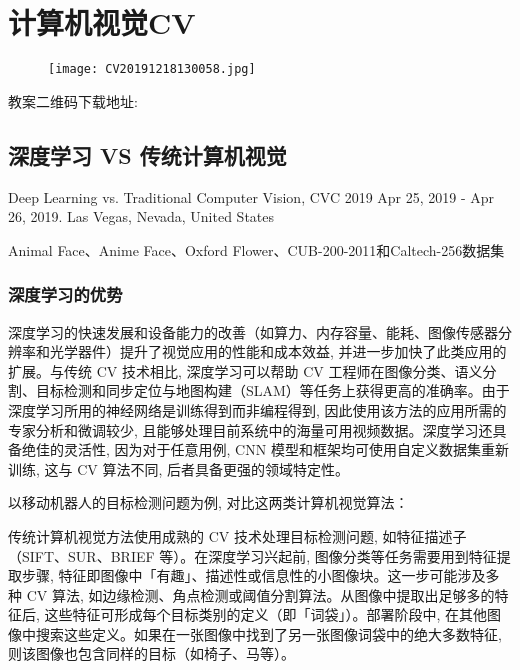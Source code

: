 \chapter{计算机视觉CV}\label{AIChapter11}
\begin{figure}[H]
\centering
\texttt{[image: CV20191218130058.jpg]}
\label{CV20191218130058}
\end{figure}
教案二维码下载地址: 
\newpage
\section{深度学习 VS 传统计算机视觉}
Deep Learning vs. Traditional Computer Vision, CVC 2019  Apr 25, 2019 - Apr 26, 2019. Las Vegas, Nevada, United States \cite{MahonyCVC2019}

Animal Face、Anime Face、Oxford Flower、CUB-200-2011和Caltech-256数据集


\subsection{深度学习的优势}

深度学习的快速发展和设备能力的改善（如算力、内存容量、能耗、图像传感器分辨率和光学器件）提升了视觉应用的性能和成本效益, 并进一步加快了此类应用的扩展。与传统 CV 技术相比, 深度学习可以帮助 CV 工程师在图像分类、语义分割、目标检测和同步定位与地图构建（SLAM）等任务上获得更高的准确率。由于深度学习所用的神经网络是训练得到而非编程得到, 因此使用该方法的应用所需的专家分析和微调较少, 且能够处理目前系统中的海量可用视频数据。深度学习还具备绝佳的灵活性, 因为对于任意用例, CNN 模型和框架均可使用自定义数据集重新训练, 这与 CV 算法不同, 后者具备更强的领域特定性。

以移动机器人的目标检测问题为例, 对比这两类计算机视觉算法：

传统计算机视觉方法使用成熟的 CV 技术处理目标检测问题, 如特征描述子（SIFT、SUR、BRIEF 等）。在深度学习兴起前, 图像分类等任务需要用到特征提取步骤, 特征即图像中「有趣」、描述性或信息性的小图像块。这一步可能涉及多种 CV 算法, 如边缘检测、角点检测或阈值分割算法。从图像中提取出足够多的特征后, 这些特征可形成每个目标类别的定义（即「词袋」）。部署阶段中, 在其他图像中搜索这些定义。如果在一张图像中找到了另一张图像词袋中的绝大多数特征, 则该图像也包含同样的目标（如椅子、马等）。

